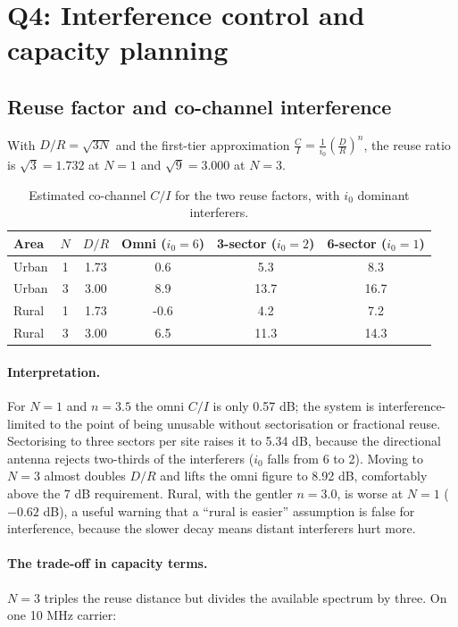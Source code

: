 \documentclass[9pt,a4paper]{extarticle}
\begin{document}
\section{Q4: Interference control and capacity planning}
\label{sec:q4}

\subsection{Reuse factor and co-channel interference}
With $D/R=\sqrt{3N}$ and the first-tier approximation
$\frac{C}{I}=\frac{1}{i_0}\left(\frac{D}{R}\right)^{n}$, the reuse ratio is
$\sqrt{3}=1.732$ at $N=1$ and $\sqrt{9}=3.000$ at $N=3$.

\begin{table}[H]\centering\small
\caption{Estimated co-channel $C/I$ for the two reuse factors, with $i_0$ dominant interferers.}
\label{tab:reuse}
\begin{tabular}{@{}lccccc@{}}
\toprule
\textbf{Area} & $N$ & $D/R$ & \textbf{Omni} ($i_0=6$) & \textbf{3-sector} ($i_0=2$) & \textbf{6-sector} ($i_0=1$) \\
\midrule
Urban & 1 & 1.73 & 0.6 & 5.3 & 8.3 \\
Urban & 3 & 3.00 & 8.9 & 13.7 & 16.7 \\
Rural & 1 & 1.73 & -0.6 & 4.2 & 7.2 \\
Rural & 3 & 3.00 & 6.5 & 11.3 & 14.3 \\
\bottomrule
\end{tabular}
\end{table}

\paragraph{Interpretation.} For $N=1$ and $n=3.5$ the omni $C/I$ is only 0.57 dB; the system is
interference-limited to the point of being unusable without sectorisation or fractional reuse.
Sectorising to three sectors per site raises it to 5.34 dB, because the directional antenna
rejects two-thirds of the interferers ($i_0$ falls from 6 to 2). Moving to $N=3$ almost doubles
$D/R$ and lifts the omni figure to 8.92 dB, comfortably above the 7 dB requirement. Rural, with
the gentler $n=3.0$, is worse at $N=1$ ($-0.62$ dB), a useful warning that a ``rural is
easier'' assumption is false for interference, because the slower decay means distant interferers
hurt more.

\paragraph{The trade-off in capacity terms.} $N=3$ triples the reuse distance but divides the
available spectrum by three. On one 10 MHz carrier:
\end{document}
